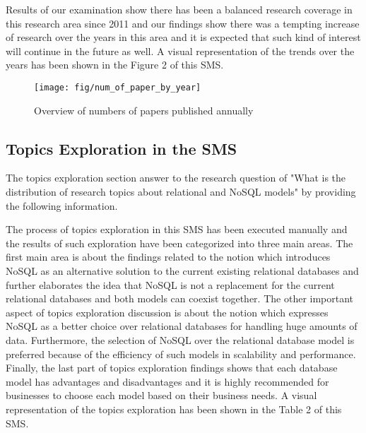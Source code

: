 \documentclass[sigconf,nonacm]{acmart}
\begin{document}
Results of our examination show there has been a balanced research coverage in this research area since 2011 and our findings show there was a tempting increase of research over the years in this area and it is expected that such kind of interest will continue in the future as well.  A visual representation of the trends over the years has been shown in the Figure 2 of this SMS.

\begin{figure}[H]
  \centering
  \texttt{[image: fig/num\_of\_paper\_by\_year]}
  \caption{Overview of numbers of papers published annually}
\end{figure}

\subsection{Topics Exploration in the SMS}
The topics exploration section answer to the research question of "What is the distribution of research topics about relational and NoSQL models" by providing the following information.

The process of topics exploration in this SMS has been executed manually and the results of such exploration have been categorized into three main areas. The first main area is about the findings related to the notion which introduces NoSQL as an alternative solution to the current existing relational databases and further elaborates the idea that NoSQL is not a replacement for the current relational databases and both models can coexist together\cite{1, 2, 3, 8}. The other important aspect of topics exploration discussion is about the notion which expresses NoSQL as a better choice over relational databases for handling huge amounts of data. Furthermore, the selection of NoSQL over the relational database model is preferred because of the efficiency of such models in scalability and performance\cite{2,5,9,14,17,19}. Finally, the last part of topics exploration findings shows that each database model has advantages and disadvantages and it is highly recommended for businesses to choose each model based on their business needs\cite{14,17,15,20}. A visual representation of the topics exploration has been shown in the Table 2 of this SMS.
\end{document}
